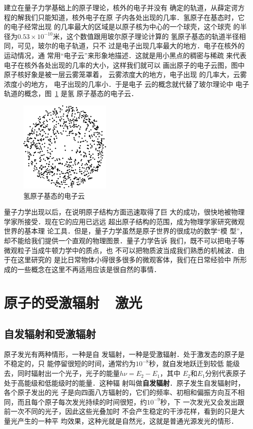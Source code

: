 建立在量子力学基础上的原子理论，核外的电子并没有
确定的轨道，从薛定谔方程的解我们只能知道，核外电子在原
子内各处出现的几率．氢原子在基态时，它的电子经常出现
的几率最大的区域是以原子核为中心的一个球壳，这个球壳
的半径为$0.53\times10^{-10}$米，这个数值跟用玻尔原子理论计算的
氢原子基态的轨道半径相同，可见，玻尔的电子轨道，只不
过是电子出现几率最大的地方．电子在核外的运动情况，通
常用“电子云”来形象地描述．这就是用小黑点的稠密与稀疏
来代表电子在核外各处出现的几率的大小，这样我们就可以
画出原子的电子云图，图中原子核好象是被一层云雾笼罩着，
云雾浓度大的地方，电子出现
的几率大，云雾浓度小的地方，
电子出现的几率小．于是电子
云的概念就代替了玻尔理论中
电子轨道的概念，图~\ref{fig_C_8-6} 是氢
原子基态的电子云．

\begin{figure}[htbp]
    \centering
    \includegraphics{fig/C/8-6.pdf}
    \caption{氢原子基态的电子云}\label{fig_C_8-6}
\end{figure}


量子力学出现以后，在说明原子结构方面迅速取得了巨
大的成功，很快地被物理学家所接受．现在它的应用已远远
超出原子结构的范围，成为物理学家研究微观世界的基本理
论工具．但是，量子力学虽然是原子世界的很成功的数学“模
型”，却不能给我们提供一个直观的物理图景．量子力学告诉
我们，既不可以把电子等微观粒子当成牛顿力学中的质点，也
不可以把物质波当成我们熟悉的机械波．由于在这里研究的
是比日常物体小得很多很多的微观客体，我们在日常经验中
所形成的一些概念在这里不再适用应该是很自然的事情．


\section{原子的受激辐射~~激光}
\subsection{自发辐射和受激辐射}

原子发光有两种情形，一种是自
发辐射，一种是受激辐射．处于激发态的原子是不稳定的，只
能停留很短的时间，通常约为$10^{-8}$秒，就自发地跃迁到较低
能级去，同时辐射出一个光子，光子的能量$h\nu =E_2-E_1$，其中
$E_2$和$E_1$分别代表原子处于高能级和低能级时的能量．这种辐
射叫做\textbf{自发辐射}．原子发生自发辐射时，各个原子发出的光
子是向四面八方辐射的，它们的频率、初相和偏振方向互不相
同，而且每个原子每次发光持续的时间很短，约$10^{-9}$秒，下
一次发光又会发出跟前一次不同的光子，因此这些光叠加时
不会产生稳定的干涉花样，看到的只是大量光产生的一种平
均效果，这种光就是自然光，这就是普通光源发光的情形．

